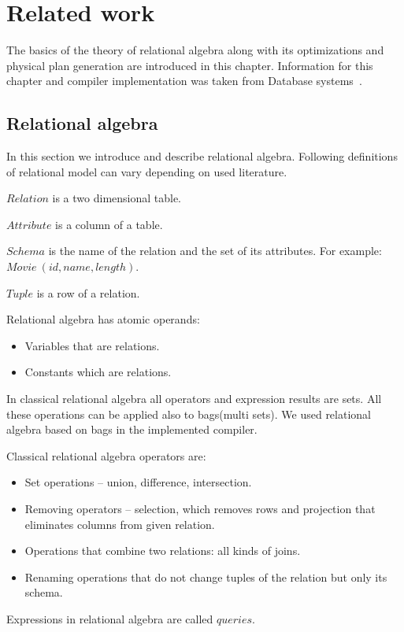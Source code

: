 \chapter{Related work}
The basics of the theory of relational algebra along with its optimizations and physical plan generation are introduced in this chapter. Information for this chapter and compiler implementation was taken from Database systems~\cite{database}.
\section{Relational algebra}

In this section we introduce and describe relational algebra\cite{database}. Following definitions of relational model can vary depending on used literature.
\begin{mydef}
$Relation$ is a two dimensional table.
\end{mydef}
\begin{mydef}
$Attribute$ is a column of a table.
\end{mydef}
\begin{mydef}
$Schema$ is the name of the relation and the set of its attributes. For example:~$Movie~(id,name,length)$.
\end{mydef}
\begin{mydef}
$Tuple$ is a row of a relation.
\end{mydef}

Relational algebra has atomic operands:
\begin{itemize}
\item Variables that are relations.
\item Constants which are relations. 
\end{itemize}

In classical relational algebra all operators and expression results are sets. All these operations can be applied also to bags(multi sets). We used relational algebra based on bags in the implemented compiler.

Classical relational algebra operators are:
\begin{itemize}
\item Set operations -- union, difference, intersection.
\item Removing operators -- selection, which removes rows and projection that eliminates columns from given relation.
\item Operations that combine two relations: all kinds of joins.
\item Renaming operations that do not change tuples of the relation but only its schema.
\end{itemize}
Expressions in relational algebra are called $queries$.
